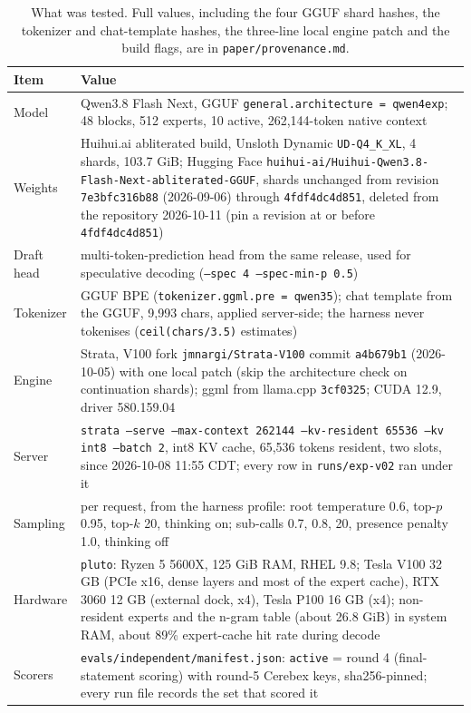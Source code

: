 \documentclass[11pt]{article}
\newcommand{\code}[1]{\texttt{#1}}
\begin{document}
\begin{table}[t]
\centering\small
\caption{What was tested. Full values, including the four GGUF shard hashes, the
tokenizer and chat-template hashes, the three-line local engine patch and the build
flags, are in \code{paper/provenance.md}.}
\label{tab:provenance}
\begin{tabularx}{\linewidth}{lX}
\toprule
Item & Value \\
\midrule
Model & Qwen3.8 Flash Next, GGUF \code{general.architecture = qwen4exp}; 48 blocks, 512 experts, 10 active, 262,144-token native context \\
Weights & Huihui.ai abliterated build, Unsloth Dynamic \code{UD-Q4\_K\_XL}, 4 shards, 103.7 GiB; Hugging Face \code{huihui-ai/Huihui-Qwen3.8-Flash-Next-abliterated-GGUF}, shards unchanged from revision \code{7e3bfc316b88} (2026-09-06) through \code{4fdf4dc4d851}, deleted from the repository 2026-10-11 (pin a revision at or before \code{4fdf4dc4d851}) \\
Draft head & multi-token-prediction head from the same release, used for speculative decoding (\code{--spec 4 --spec-min-p 0.5}) \\
Tokenizer & GGUF BPE (\code{tokenizer.ggml.pre = qwen35}); chat template from the GGUF, 9,993 chars, applied server-side; the harness never tokenises (\code{ceil(chars/3.5)} estimates) \\
Engine & Strata, V100 fork \code{jmnargi/Strata-V100} commit \code{a4b679b1} (2026-10-05) with one local patch (skip the architecture check on continuation shards); ggml from llama.cpp \code{3cf0325}; CUDA 12.9, driver 580.159.04 \\
Server & \code{strata --serve --max-context 262144 --kv-resident 65536 --kv int8 --batch 2}, int8 KV cache, 65,536 tokens resident, two slots, since 2026-10-08 11:55 CDT; every row in \code{runs/exp-v02} ran under it \\
Sampling & per request, from the harness profile: root temperature 0.6, top-$p$ 0.95, top-$k$ 20, thinking on; sub-calls 0.7, 0.8, 20, presence penalty 1.0, thinking off \\
Hardware & \code{pluto}: Ryzen 5 5600X, 125 GiB RAM, RHEL 9.8; Tesla V100 32 GB (PCIe x16, dense layers and most of the expert cache), RTX 3060 12 GB (external dock, x4), Tesla P100 16 GB (x4); non-resident experts and the n-gram table (about 26.8 GiB) in system RAM, about 89\% expert-cache hit rate during decode \\
Scorers & \code{evals/independent/manifest.json}: \code{active} = round 4 (final-statement scoring) with round-5 Cerebex keys, sha256-pinned; every run file records the set that scored it \\
\bottomrule
\end{tabularx}
\end{table}
\end{document}
